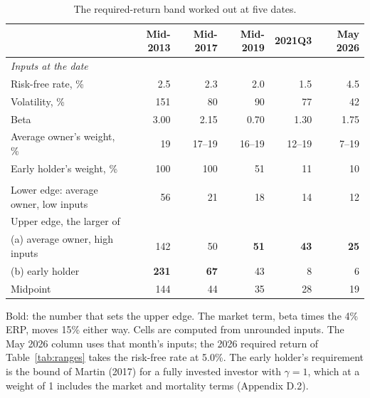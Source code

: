 \documentclass[11pt]{article}
\begin{document}
\begin{table}[ht]\centering\small
\caption{The required-return band worked out at five dates.}
\label{tab:band}
\begin{tabular}{lrrrrr}
\toprule
 & Mid-2013 & Mid-2017 & Mid-2019 & 2021Q3 & May 2026 \\
\midrule
\multicolumn{6}{l}{\emph{Inputs at the date}} \\
\quad Risk-free rate, \% & 2.5 & 2.3 & 2.0 & 1.5 & 4.5 \\
\quad Volatility, \% & 151 & 80 & 90 & 77 & 42 \\
\quad Beta & 3.00 & 2.15 & 0.70 & 1.30 & 1.75 \\
\quad Average owner's weight, \% & 19 & 17--19 & 16--19 & 12--19 & 7--19 \\
\quad Early holder's weight, \% & 100 & 100 & 51 & 11 & 10 \\
\addlinespace
\multicolumn{6}{l}{\emph{Required return, \% a year}} \\
\quad Lower edge: average owner, low inputs & 56 & 21 & 18 & 14 & 12 \\
\quad Upper edge, the larger of & & & & & \\
\hspace{2.4em}(a) average owner, high inputs & 142 & 50 & \textbf{51} & \textbf{43} & \textbf{25} \\
\hspace{2.4em}(b) early holder & \textbf{231} & \textbf{67} & 43 & 8 & 6 \\
\quad Midpoint & 144 & 44 & 35 & 28 & 19 \\
\bottomrule
\end{tabular}
\par\smallskip\begin{minipage}{0.9\textwidth}\footnotesize Bold: the number that sets the upper edge. The market term, beta times the 4\% ERP, moves 15\% either way. Cells are computed from unrounded inputs. The May 2026 column uses that month's inputs; the 2026 required return of Table~\ref{tab:ranges} takes the risk-free rate at 5.0\%. The early holder's requirement is the bound of Martin (2017) for a fully invested investor with $\gamma = 1$, which at a weight of 1 includes the market and mortality terms (Appendix D.2).\end{minipage}
\end{table}
\end{document}
